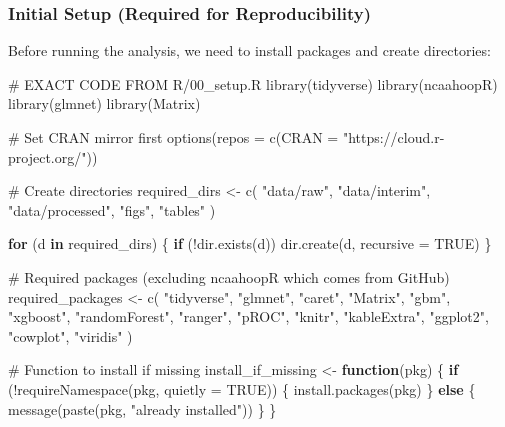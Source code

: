 \documentclass[
  letterpaper,
  DIV=11,
  numbers=noendperiod]{scrartcl}
\newenvironment{Shaded}{\begin{snugshade}}{\end{snugshade}}
\newcommand{\AttributeTok}[1]{\textcolor[rgb]{0.40,0.45,0.13}{#1}}
\newcommand{\CommentTok}[1]{\textcolor[rgb]{0.37,0.37,0.37}{#1}}
\newcommand{\ConstantTok}[1]{\textcolor[rgb]{0.56,0.35,0.01}{#1}}
\newcommand{\ControlFlowTok}[1]{\textcolor[rgb]{0.00,0.23,0.31}{\textbf{#1}}}
\newcommand{\FunctionTok}[1]{\textcolor[rgb]{0.28,0.35,0.67}{#1}}
\newcommand{\NormalTok}[1]{\textcolor[rgb]{0.00,0.23,0.31}{#1}}
\newcommand{\OtherTok}[1]{\textcolor[rgb]{0.00,0.23,0.31}{#1}}
\newcommand{\SpecialCharTok}[1]{\textcolor[rgb]{0.37,0.37,0.37}{#1}}
\newcommand{\StringTok}[1]{\textcolor[rgb]{0.13,0.47,0.30}{#1}}
\begin{document}
\subsubsection{Initial Setup (Required for
Reproducibility)}\label{initial-setup-required-for-reproducibility}

Before running the analysis, we need to install packages and create
directories:

\begin{Shaded}
\begin{Highlighting}[]
\CommentTok{\# EXACT CODE FROM R/00\_setup.R}
\FunctionTok{library}\NormalTok{(tidyverse)}
\FunctionTok{library}\NormalTok{(ncaahoopR)}
\FunctionTok{library}\NormalTok{(glmnet)}
\FunctionTok{library}\NormalTok{(Matrix)}

\CommentTok{\# Set CRAN mirror first}
\FunctionTok{options}\NormalTok{(}\AttributeTok{repos =} \FunctionTok{c}\NormalTok{(}\AttributeTok{CRAN =} \StringTok{"https://cloud.r{-}project.org/"}\NormalTok{))}

\CommentTok{\# Create directories}
\NormalTok{required\_dirs }\OtherTok{\textless{}{-}} \FunctionTok{c}\NormalTok{(}
  \StringTok{"data/raw"}\NormalTok{,}
  \StringTok{"data/interim"}\NormalTok{,}
  \StringTok{"data/processed"}\NormalTok{,}
  \StringTok{"figs"}\NormalTok{,}
  \StringTok{"tables"}
\NormalTok{)}

\ControlFlowTok{for}\NormalTok{ (d }\ControlFlowTok{in}\NormalTok{ required\_dirs) \{}
  \ControlFlowTok{if}\NormalTok{ (}\SpecialCharTok{!}\FunctionTok{dir.exists}\NormalTok{(d)) }\FunctionTok{dir.create}\NormalTok{(d, }\AttributeTok{recursive =} \ConstantTok{TRUE}\NormalTok{)}
\NormalTok{\}}

\CommentTok{\# Required packages (excluding ncaahoopR which comes from GitHub)}
\NormalTok{required\_packages }\OtherTok{\textless{}{-}} \FunctionTok{c}\NormalTok{(}
  \StringTok{"tidyverse"}\NormalTok{,}
  \StringTok{"glmnet"}\NormalTok{,}
  \StringTok{"caret"}\NormalTok{,}
  \StringTok{"Matrix"}\NormalTok{,}
  \StringTok{"gbm"}\NormalTok{,}
  \StringTok{"xgboost"}\NormalTok{,}
  \StringTok{"randomForest"}\NormalTok{,}
  \StringTok{"ranger"}\NormalTok{, }
  \StringTok{"pROC"}\NormalTok{,}
  \StringTok{"knitr"}\NormalTok{,}
  \StringTok{"kableExtra"}\NormalTok{,}
  \StringTok{"ggplot2"}\NormalTok{,}
  \StringTok{"cowplot"}\NormalTok{,}
  \StringTok{"viridis"}
\NormalTok{)}

\CommentTok{\# Function to install if missing}
\NormalTok{install\_if\_missing }\OtherTok{\textless{}{-}} \ControlFlowTok{function}\NormalTok{(pkg) \{}
  \ControlFlowTok{if}\NormalTok{ (}\SpecialCharTok{!}\FunctionTok{requireNamespace}\NormalTok{(pkg, }\AttributeTok{quietly =} \ConstantTok{TRUE}\NormalTok{)) \{}
    \FunctionTok{install.packages}\NormalTok{(pkg)}
\NormalTok{  \} }\ControlFlowTok{else}\NormalTok{ \{}
    \FunctionTok{message}\NormalTok{(}\FunctionTok{paste}\NormalTok{(pkg, }\StringTok{"already installed"}\NormalTok{))}
\NormalTok{  \}}
\NormalTok{\}}


\end{Highlighting}
\end{Shaded}
\end{document}
